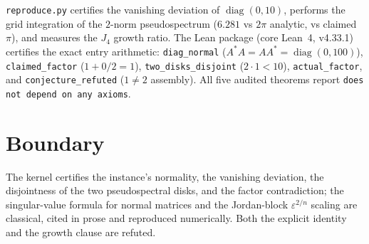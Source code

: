 \documentclass[11pt]{article}
\begin{document}
\texttt{reproduce.py} certifies the vanishing deviation of
$\operatorname{diag}(0,10)$, performs the grid integration of the
$2$-norm pseudospectrum ($6.281$ vs $2\pi$ analytic, vs claimed
$\pi$), and measures the $J_4$ growth ratio. The Lean package (core
Lean~4, v4.33.1) certifies the exact entry arithmetic:
\texttt{diag\_normal} ($A^*A = AA^* = \operatorname{diag}(0,100)$),
\texttt{claimed\_factor} ($1 + 0/2 = 1$),
\texttt{two\_disks\_disjoint} ($2 \cdot 1 < 10$),
\texttt{actual\_factor}, and \texttt{conjecture\_refuted} ($1 \ne 2$
assembly). All five audited theorems report \texttt{does not depend
on any axioms}.

\section{Boundary}

The kernel certifies the instance's normality, the vanishing
deviation, the disjointness of the two pseudospectral disks, and the
factor contradiction; the singular-value formula for normal matrices
and the Jordan-block $\varepsilon^{2/n}$ scaling are classical,
cited in prose and reproduced numerically. Both the explicit identity
and the growth clause are refuted.
\end{document}
